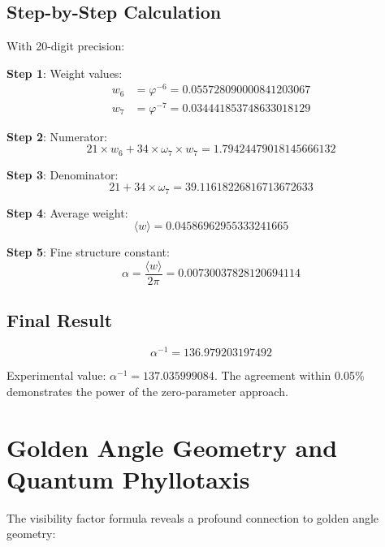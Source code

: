 \documentclass[%
 reprint,
 amsmath,amssymb,
 aps,
 prd,
 10pt,
 nofootinbib,      %
 longbibliography  %
]{revtex4-2}
\theoremstyle{definition}
\theoremstyle{remark}
\begin{document}
\subsection{Step-by-Step Calculation}

With 20-digit precision:

\textbf{Step 1}: Weight values:
\begin{align}
w_6 &= \varphi^{-6} = 0.055728090000841203067 \\
w_7 &= \varphi^{-7} = 0.034441853748633018129
\end{align}

\textbf{Step 2}: Numerator:
\begin{equation}
21 \times w_6 + 34 \times \omega_7 \times w_7 = 1.79424479018145666132
\end{equation}

\textbf{Step 3}: Denominator:
\begin{equation}
21 + 34 \times \omega_7 = 39.11618226816713672633
\end{equation}

\textbf{Step 4}: Average weight:
\begin{equation}
\langle w \rangle = 0.04586962955333241665
\end{equation}

\textbf{Step 5}: Fine structure constant:
\begin{equation}
\alpha = \frac{\langle w \rangle}{2\pi} = 0.00730037828120694114
\end{equation}

\subsection{Final Result}

\begin{equation}
\boxed{\alpha^{-1} = 136.979203197492}
\end{equation}

Experimental value: $\alpha^{-1} = 137.035999084$. The agreement within 0.05\% demonstrates the power of the zero-parameter approach.

\section{Golden Angle Geometry and Quantum Phyllotaxis}\label{sec:golden}

The visibility factor formula reveals a profound connection to golden angle geometry:
\end{document}
